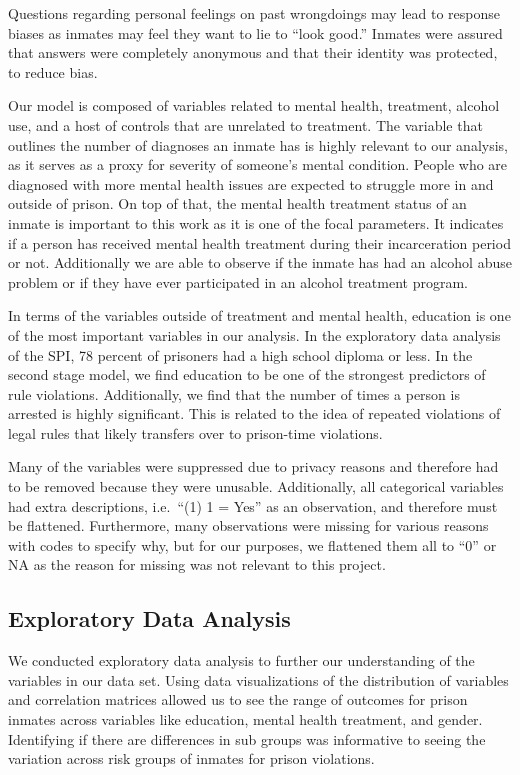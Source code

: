 \documentclass[
]{article}
\begin{document}
Questions regarding personal feelings on past wrongdoings may lead to
response biases as inmates may feel they want to lie to ``look good.''
Inmates were assured that answers were completely anonymous and that
their identity was protected, to reduce bias.

Our model is composed of variables related to mental health, treatment,
alcohol use, and a host of controls that are unrelated to treatment. The
variable that outlines the number of diagnoses an inmate has is highly
relevant to our analysis, as it serves as a proxy for severity of
someone's mental condition. People who are diagnosed with more mental
health issues are expected to struggle more in and outside of prison. On
top of that, the mental health treatment status of an inmate is
important to this work as it is one of the focal parameters. It
indicates if a person has received mental health treatment during their
incarceration period or not. Additionally we are able to observe if the
inmate has had an alcohol abuse problem or if they have ever
participated in an alcohol treatment program.

In terms of the variables outside of treatment and mental health,
education is one of the most important variables in our analysis. In the
exploratory data analysis of the SPI, 78 percent of prisoners had a high
school diploma or less. In the second stage model, we find education to
be one of the strongest predictors of rule violations. Additionally, we
find that the number of times a person is arrested is highly
significant. This is related to the idea of repeated violations of legal
rules that likely transfers over to prison-time violations.

Many of the variables were suppressed due to privacy reasons and
therefore had to be removed because they were unusable. Additionally,
all categorical variables had extra descriptions, i.e.~``(1) 1 = Yes''
as an observation, and therefore must be flattened. Furthermore, many
observations were missing for various reasons with codes to specify why,
but for our purposes, we flattened them all to ``0'' or NA as the reason
for missing was not relevant to this project.

\subsection{Exploratory Data Analysis}\label{exploratory-data-analysis}

We conducted exploratory data analysis to further our understanding of
the variables in our data set. Using data visualizations of the
distribution of variables and correlation matrices allowed us to see the
range of outcomes for prison inmates across variables like education,
mental health treatment, and gender. Identifying if there are
differences in sub groups was informative to seeing the variation across
risk groups of inmates for prison violations.
\end{document}
